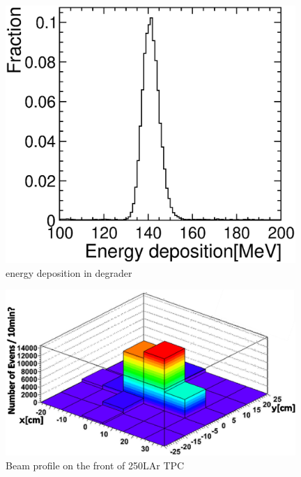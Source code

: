    \begin{figure}[!htb]
    \centering
    \centering
    \includegraphics[width=11cm,clip]{./fig/energy_deposition.eps}
    \caption{energy deposition in degrader}
    \label{energy_deposition}
   \end{figure}


   \begin{figure}[!htb]
    \centering
    \centering
    \includegraphics[width=11cm,clip]{./fig/BeamProfile3.eps}
    \caption{Beam profile on the front of 250LAr TPC}
    \label{beamprofile_250L}
   \end{figure}
